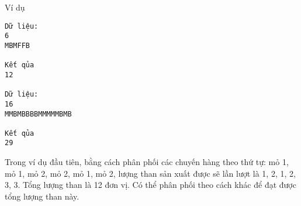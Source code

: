 Ví dụ
\begin{verbatim}
Dữ liệu:
6
MBMFFB

Kết qủa
12

Dữ liệu:
16
MMBMBBBBMMMMMBMB

Kết qủa
29
\end{verbatim}

   Trong ví dụ đầu tiên, bằng cách phân phối các chuyến hàng theo thứ tự: mỏ 1, mỏ 1, mỏ 2, mỏ 2, mỏ 1, mỏ 2, lượng than sản xuất được sẽ lần lượt là 1, 2, 1, 2, 3, 3. Tổng lượng than là 12 đơn vị. Có thể phân phối theo cách khác để đạt được tổng lượng than này.